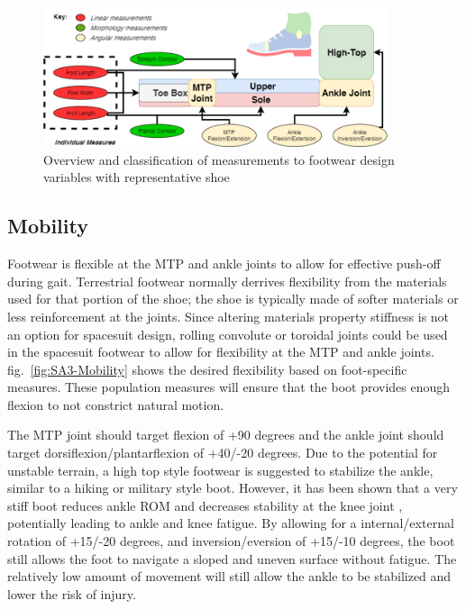 \documentclass[defaultstyle,11pt]{comps}
\begin{document}
\begin{figure}
\hypertarget{fig:SA3-Overview}{%
\centering
\includegraphics[width=0.9\textwidth,height=\textheight]{../fig/SA3/Overview.png}
\caption{Overview and classification of measurements to footwear design variables with representative shoe}\label{fig:SA3-Overview}
}
\end{figure}

\hypertarget{mobility}{%
\subsection{Mobility}\label{mobility}}

Footwear is flexible at the MTP and ankle joints to allow for effective push-off during gait. Terrestrial footwear normally derrives flexibility from the materials used for that portion of the shoe; the shoe is typically made of softer materials or less reinforcement at the joints. Since altering materials property stiffness is not an option for spacesuit design, rolling convolute or toroidal joints could be used in the spacesuit footwear to allow for flexibility at the MTP and ankle joints\citep{Harris2001}. fig.~\ref{fig:SA3-Mobility} shows the desired flexibility based on foot-specific measures. These population measures will ensure that the boot provides enough flexion to not constrict natural motion.

The MTP joint should target flexion of +90 degrees and the ankle joint should target dorsiflexion/plantarflexion of +40/-20 degrees.
Due to the potential for unstable terrain, a high top style footwear is suggested to stabilize the ankle, similar to a hiking or military style boot.
However, it has been shown that a very stiff boot reduces ankle ROM and decreases stability at the knee joint \citep{Bohm2010}, potentially leading to ankle and knee fatigue.
By allowing for a internal/external rotation of +15/-20 degrees, and inversion/eversion of +15/-10 degrees, the boot still allows the foot to navigate a sloped and uneven surface without fatigue.
The relatively low amount of movement will still allow the ankle to be stabilized and lower the risk of injury.
\end{document}
